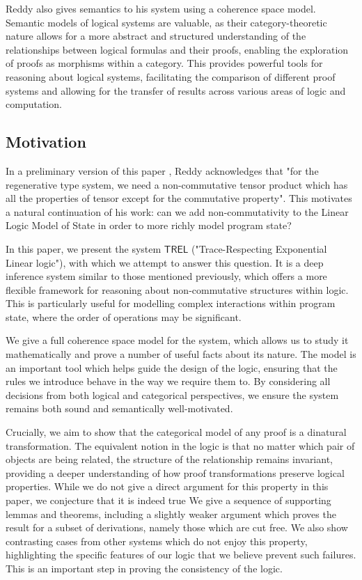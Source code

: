 \documentclass[11pt, oneside]{article}
\theoremstyle{plain}
\theoremstyle{definition}
\newcommand{\sSys}{{\mathsf{TREL}}}%
\begin{document}
Reddy also gives semantics to his system using a coherence space model.
Semantic models of logical systems are valuable, as their category-theoretic nature allows for a more abstract and structured understanding of the relationships between logical formulas and their proofs, enabling the exploration of proofs as morphisms within a category.
This provides powerful tools for reasoning about logical systems, facilitating the comparison of different proof systems and allowing for the transfer of results across various areas of logic and computation.

\subsection{Motivation}
In a preliminary version of this paper \cite{reddy1993linear}, Reddy acknowledges that "for the regenerative type system, we need a non-commutative tensor product which has all the properties of tensor except for the commutative property".
This motivates a natural continuation of his work: can we add non-commutativity to the Linear Logic Model of State in order to more richly model program state?

In this paper, we present the system $\sSys$ ("Trace-Respecting Exponential Linear logic"), with which we attempt to answer this question.
It is a deep inference system similar to those mentioned previously, which offers a more flexible framework for reasoning about non-commutative structures within logic.
This is particularly useful for modelling complex interactions within program state, where the order of operations may be significant.

We give a full coherence space model for the system, which allows us to study it mathematically and prove a number of useful facts about its nature.
The model is an important tool which helps guide the design of the logic, ensuring that the rules we introduce behave in the way we require them to.
By considering all decisions from both logical and categorical perspectives, we ensure the system remains both sound and semantically well-motivated.

Crucially, we aim to show that the categorical model of any proof is a dinatural transformation.
The equivalent notion in the logic is that no matter which pair of objects are being related, the structure of the relationship remains invariant, providing a deeper understanding of how proof transformations preserve logical properties.
While we do not give a direct argument for this property in this paper, we conjecture that it is indeed true
We give a sequence of supporting lemmas and theorems, including a slightly weaker argument which proves the result for a subset of derivations, namely those which are cut free.
We also show contrasting cases from other systems which do not enjoy this property, highlighting the specific features of our logic that we believe prevent such failures.
This is an important step in proving the consistency of the logic.
\end{document}
